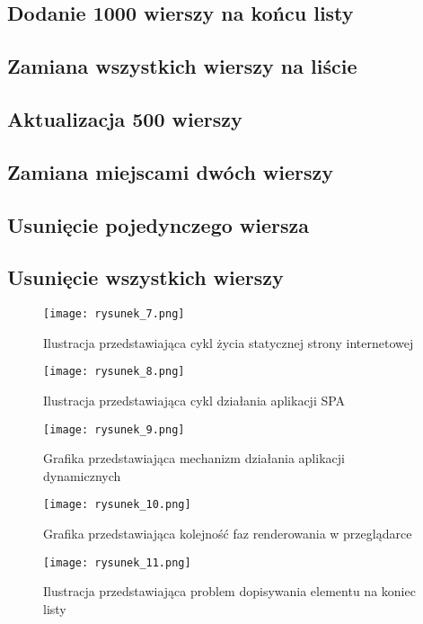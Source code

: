 \subsection{Dodanie 1000 wierszy na końcu listy}
\subsection{Zamiana wszystkich wierszy na liście}
\subsection{Aktualizacja 500 wierszy}
\subsection{Zamiana miejscami dwóch wierszy}
\subsection{Usunięcie pojedynczego wiersza}
\subsection{Usunięcie wszystkich wierszy}

\begin{figure}[!ht]
    \centering
    \texttt{[image: rysunek\_7.png]}
    \caption{Ilustracja przedstawiająca cykl życia statycznej strony internetowej}
    \label{fig:rysunek_7}
\end{figure}

\begin{figure}[!ht]
    \centering
    \texttt{[image: rysunek\_8.png]}
    \caption{Ilustracja przedstawiająca cykl działania aplikacji SPA}
    \label{fig:rysunek_8}
\end{figure}

\begin{figure}[!ht]
    \centering
    \texttt{[image: rysunek\_9.png]}
    \caption{Grafika przedstawiająca mechanizm działania aplikacji dynamicznych}
    \label{fig:rysunek_9}
\end{figure}

\begin{figure}[!ht]
    \centering
    \texttt{[image: rysunek\_10.png]}
    \caption{Grafika przedstawiająca kolejność faz renderowania w przeglądarce}
    \label{fig:rysunek_10}
\end{figure}

\begin{figure}[!ht]
    \centering
    \texttt{[image: rysunek\_11.png]}
    \caption{Ilustracja przedstawiająca problem dopisywania elementu na koniec listy}
    \label{fig:rysunek_11}
\end{figure}


